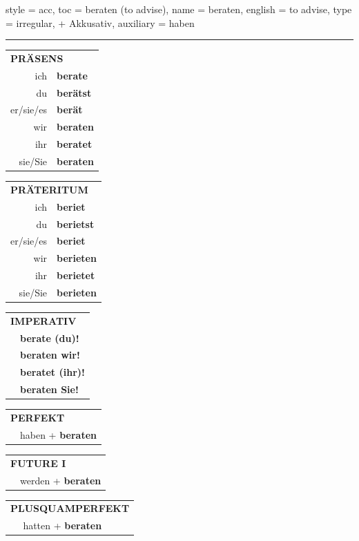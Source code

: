 \begin{verbentry}{
  style = {acc},
  toc = {beraten (to advise)},
  name = {beraten},
  english = {to advise},
  type = {irregular, + Akkusativ},
  auxiliary = {haben}
}


\vspace{5pt}
\hrule
\vspace{5pt}

\begin{tabular}{rl}
\multicolumn{2}{l}{\textbf{PRÄSENS}}\\
ich & \textbf{berate}\\
du & \textbf{berätst}\\
er/sie/es & \textbf{berät}\\
wir & \textbf{beraten}\\
ihr & \textbf{beratet}\\
sie/Sie & \textbf{beraten}\\
\end{tabular}
\hfill
\begin{tabular}{rl}
\multicolumn{2}{l}{\textbf{PRÄTERITUM}}\\
ich & \textbf{beriet}\\
du & \textbf{berietst}\\
er/sie/es & \textbf{beriet}\\
wir & \textbf{berieten}\\
ihr & \textbf{berietet}\\
sie/Sie & \textbf{berieten}\\
\end{tabular}
\hfill
\begin{tabular}{rl}
\multicolumn{2}{l}{\textbf{IMPERATIV}}\\
& \textbf{berate (du)!}\\
& \textbf{beraten wir!}\\
& \textbf{beratet (ihr)!}\\
& \textbf{beraten Sie!}\\
\end{tabular}

\vspace{10pt}

\begin{tabular}{rl}
\multicolumn{2}{l}{\textbf{PERFEKT}}\\
& haben + \textbf{beraten}\\
\end{tabular}
\hfill
\begin{tabular}{rl}
\multicolumn{2}{l}{\textbf{FUTURE I}}\\
& werden + \textbf{beraten}\\
\end{tabular}
\hfill
\begin{tabular}{rl}
\multicolumn{2}{l}{\textbf{PLUSQUAMPERFEKT}}\\
& hatten + \textbf{beraten}\\
\end{tabular}


\end{verbentry}

